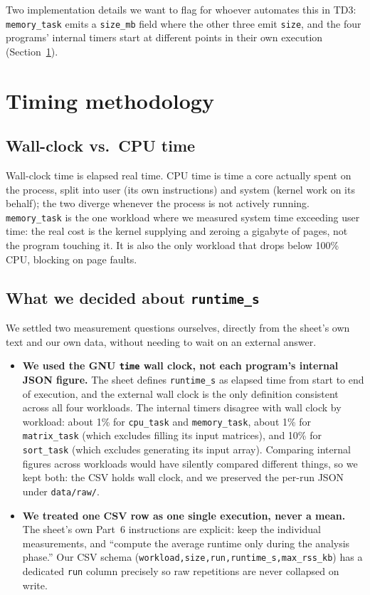 \documentclass[11pt]{article}
\newcommand{\code}[1]{\texttt{#1}}
\begin{document}
Two implementation details we want to flag for whoever automates this in TD3: \code{memory\_task}
emits a \code{size\_mb} field where the other three emit \code{size}, and the four programs' internal
timers start at different points in their own execution (Section~\ref{sec:timing}).

\section{Timing methodology}
\label{sec:timing}

\subsection{Wall-clock vs.\ CPU time}
Wall-clock time is elapsed real time. CPU time is time a core actually spent on the process, split
into user (its own instructions) and system (kernel work on its behalf); the two diverge whenever
the process is not actively running. \code{memory\_task} is the one workload where we measured
system time exceeding user time: the real cost is the kernel supplying and zeroing a gigabyte of
pages, not the program touching it. It is also the only workload that drops below 100\% CPU,
blocking on page faults.

\subsection{What we decided about \code{runtime\_s}}
We settled two measurement questions ourselves, directly from the sheet's own text and our own
data, without needing to wait on an external answer.

\begin{itemize}[leftmargin=*]
\item \textbf{We used the GNU \code{time} wall clock, not each program's internal JSON figure.}
The sheet defines \code{runtime\_s} as elapsed time from start to end of execution, and the
external wall clock is the only definition consistent across all four workloads. The internal
timers disagree with wall clock by workload: about 1\% for \code{cpu\_task} and
\code{memory\_task}, about 1\% for \code{matrix\_task} (which excludes filling its input
matrices), and 10\% for \code{sort\_task} (which excludes generating its input array). Comparing
internal figures across workloads would have silently compared different things, so we kept both:
the CSV holds wall clock, and we preserved the per-run JSON under \code{data/raw/}.
\item \textbf{We treated one CSV row as one single execution, never a mean.} The sheet's own
Part~6 instructions are explicit: keep the individual measurements, and ``compute the average
runtime only during the analysis phase.'' Our CSV schema
(\code{workload,size,run,runtime\_s,max\_rss\_kb}) has a dedicated \code{run} column precisely so
raw repetitions are never collapsed on write.
\end{itemize}
\end{document}
